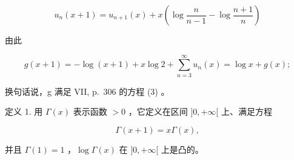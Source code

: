 \[
u _ {n} (x + 1) = u _ {n + 1} (x) + x \left(\log \frac {n}{n - 1} - \log \frac {n + 1}{n}\right)
\]

由此

\[
g (x + 1) = - \log (x + 1) + x \log 2 + \sum_ {n = 3} ^ {\infty} u _ {n} (x) = \log x + g (x);
\]

换句话说，g 满足 VII, p.~306 的方程 (3) 。

定义 1. 用 \(\Gamma(x)\) 表示函数 \(>0\) ，它定义在区间 \(]0, +\infty[\) 上、满足方程

\[
\Gamma (x + 1) = x \Gamma (x),\tag{7}
\]

并且 \(\Gamma(1) = 1\) ，\(\log \Gamma(x)\) 在 \(]0, +\infty[\) 上是凸的。

